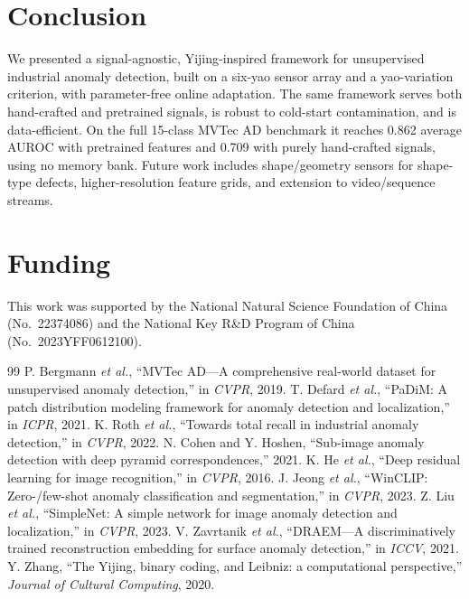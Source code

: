 \documentclass[preprint,12pt]{elsarticle}
\begin{document}
\section{Conclusion}
We presented a signal-agnostic, Yijing-inspired framework for unsupervised
industrial anomaly detection, built on a six-yao sensor array and a
yao-variation criterion, with parameter-free online adaptation. The same
framework serves both hand-crafted and pretrained signals, is robust to
cold-start contamination, and is data-efficient. On the full 15-class
MVTec AD benchmark it reaches 0.862 average AUROC with pretrained features
and 0.709 with purely hand-crafted signals, using no memory bank. Future
work includes shape/geometry sensors for shape-type defects, higher-resolution
feature grids, and extension to video/sequence streams.

\section*{Funding}
This work was supported by the National Natural Science Foundation of China
(No.\ 22374086) and the National Key R\&D Program of China (No.\ 2023YFF0612100).


\begin{thebibliography}{99}
 P. Bergmann \emph{et al.}, ``MVTec AD---A
comprehensive real-world dataset for unsupervised anomaly detection,''
in \emph{CVPR}, 2019.
 T. Defard \emph{et al.}, ``PaDiM: A patch
distribution modeling framework for anomaly detection and localization,''
in \emph{ICPR}, 2021.
 K. Roth \emph{et al.}, ``Towards total recall
in industrial anomaly detection,'' in \emph{CVPR}, 2022.
 N. Cohen and Y. Hoshen, ``Sub-image anomaly
detection with deep pyramid correspondences,'' 2021.
 K. He \emph{et al.}, ``Deep residual learning for
image recognition,'' in \emph{CVPR}, 2016.
 J. Jeong \emph{et al.}, ``WinCLIP: Zero-/few-shot
anomaly classification and segmentation,'' in \emph{CVPR}, 2023.
 Z. Liu \emph{et al.}, ``SimpleNet: A simple
network for image anomaly detection and localization,'' in \emph{CVPR}, 2023.
 V. Zavrtanik \emph{et al.}, ``DRAEM---A
discriminatively trained reconstruction embedding for surface anomaly
detection,'' in \emph{ICCV}, 2021.
 Y. Zhang, ``The Yijing, binary coding, and Leibniz:
a computational perspective,'' \emph{Journal of Cultural Computing}, 2020.
\end{thebibliography}
\end{document}
